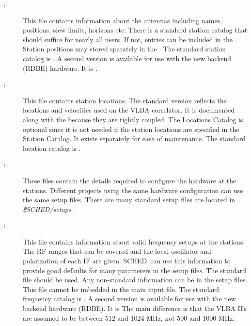 \documentclass{report}
\newcommand{\schedb}{{\sc SCHED~}}
\begin{document}
\begin{description}
\item[:] This file contains
information about the antennas including names, positions, slew
limits, horizons etc.  There is a standard station catalog that should
suffice for nearly all users.  If not, entries can be included in the
.  Station positions may
stored sparately in the .  The
standard station catalog is .  A second version
is available for use with the new backend (RDBE) hardware.  It is
.

\item[:] This file contains
station locations.  The standard version reflects the locations and
velocities used on the VLBA correlator.  It is documented along with
the  because they are tightly
coupled.  The Locations Catalog is optional since it is not needed if
the station locations are specified in the Station Catalog.  It exists
separately for ease of maintenance.  The standard
location catalog is .

\item[:] These files contain the
details required to configure the hardware at the stations.  Different
projects using the same hardware configuration can use the same setup
files.  There are many standard setup files are located in
{\sl \$SCHED/setups}.

\item[:] This file contains
information about valid frequency setups at the stations.  The RF
ranges that can be covered and the local oscillator and polarization
of each IF are given.  \schedb can use this information to provide
good defaults for many parameters in the setup files.  The standard
file should be used.  Any non-standard information can be in the setup
files.  This file cannot be imbedded in the main input file.  The standard
frequency catalog is .  A second version is
available for use with the new backend hardware (RDBE).  It is
The main difference is that the VLBA IFs are assumed to be between 512
and 1024 MHz, not 500 and 1000 MHz.


\end{description}
\end{document}
